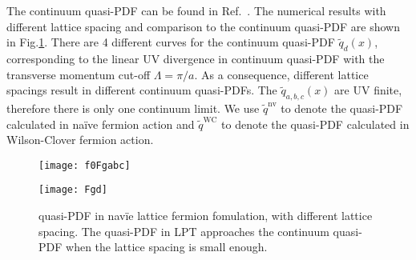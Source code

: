 \documentclass[english,preprint,aps,prd,showpacs,superscriptaddress,nofootinbib,tightenlines]{revtex4}
\begin{document}
The continuum quasi-PDF can be found in Ref.~\cite{Xiong:2013bka}.
The numerical results with different lattice spacing and comparison
to the continuum quasi-PDF are shown in Fig.\ref{fig:q_abcd}. There are
4 different curves for the continuum quasi-PDF $\tilde{q}_{d}\left(x\right)$,
corresponding to the linear UV divergence in continuum quasi-PDF
with the transverse momentum cut-off $\Lambda=\pi/a$. As a consequence,
different lattice spacings result in different continuum quasi-PDFs. The $\tilde{q}_{a,b,c}(x)$
are UV finite, therefore there is only one continuum limit. We use $\tilde{q}^{\text{nv}}$ to denote the quasi-PDF calculated in na\"ive fermion action and $\tilde{q}^{\text{WC}}$ to denote the quasi-PDF calculated in Wilson-Clover fermion action.

\begin{figure}
\begin{centering}
\texttt{[image: f0Fgabc]}
\par\end{centering}
\begin{centering}
\texttt{[image: Fgd]}
\par\end{centering}
\centering{}\caption{quasi-PDF in nav\"ie lattice fermion fomulation, with different lattice
spacing. The quasi-PDF in LPT approaches the continuum
quasi-PDF when the lattice spacing is small enough. }
\label{fig:q_abcd}
\end{figure}
\end{document}

